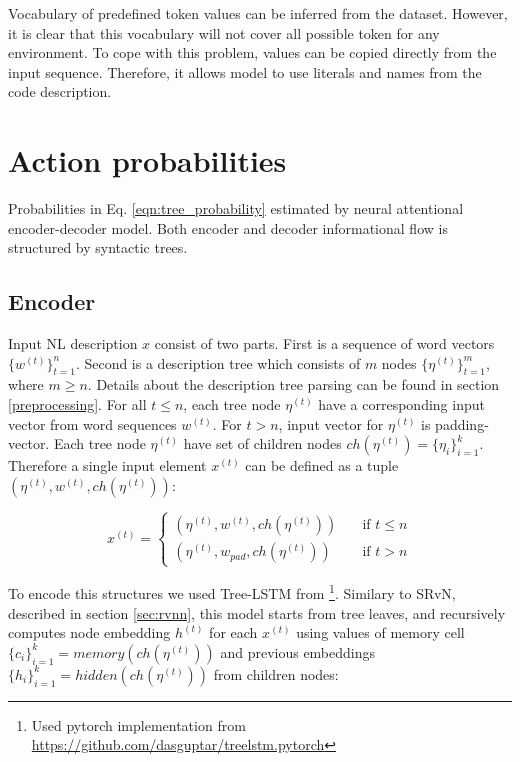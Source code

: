 Vocabulary of predefined token values can be inferred from the dataset. However, it is clear that this vocabulary will not cover all possible token for any environment. To cope with this problem, values can be copied directly from the input sequence. Therefore, it allows model to use literals and names from the code description.

\section{Action probabilities}
Probabilities in Eq. \ref{eqn:tree_probability} estimated by neural attentional encoder-decoder model. Both encoder and decoder informational flow is structured by syntactic trees. 

\subsection{Encoder}
Input NL description $x$ consist of two parts. First is a sequence of word vectors $\{w^{(t)}\}^n_{t=1}$. Second is a description tree which consists of $m$ nodes $\{\eta^{(t)}\}^m_{t=1}$, where $m\geq n$. Details about the description tree parsing can be found in section \ref{preprocessing}. For all $t \leq n$, each tree node $\eta^{(t)}$ have a corresponding input vector from word sequences $w^{(t)}$. For $t > n$, input vector for $\eta^{(t)}$ is padding-vector. Each tree node $\eta^{(t)}$ have set of children nodes $ch(\eta^{(t)})=\{\eta_{i}\}^k_{i=1}$. Therefore a single input element $x^{(t)}$ can be defined as a tuple $(\eta^{(t)}, w^{(t)}, ch(\eta^{(t)}))$:

\begin{equation}
 x^{(t)} =
  \begin{cases}
    (\eta^{(t)}, w^{(t)}, ch(\eta^{(t)}))  & \quad \text{if } t\leq n\\
    (\eta^{(t)}, w_{pad}, ch(\eta^{(t)}))  & \quad \text{if } t > n
  \end{cases}
\label{eq:enc_input}
\end{equation}

To encode this structures we used Tree-LSTM from \cite{Tai2015}\footnote{Used pytorch implementation from \href{https://github.com/dasguptar/treelstm.pytorch}{https://github.com/dasguptar/treelstm.pytorch}}. Similary to SRvN, described in section \ref{sec:rvnn}, this model starts from tree leaves, and recursively computes node embedding $h^{(t)}$ for each $x^{(t)}$ using values of memory cell $\{c_i\}^{k}_{i=1} = memory(ch(\eta^{(t)}))$ and previous  embeddings $\{h_i\}^{k}_{i=1} = hidden(ch(\eta^{(t)}))$ from children nodes:

